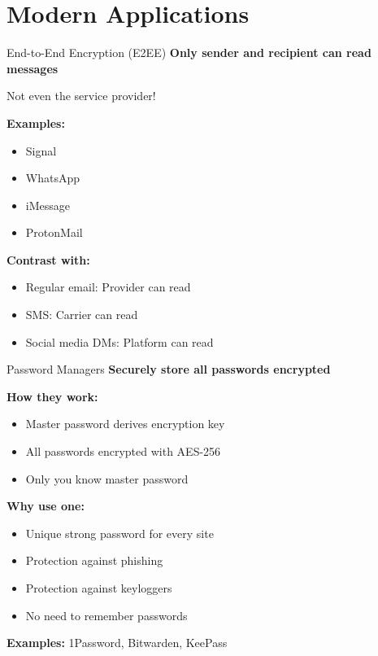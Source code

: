 \documentclass{beamer}
\begin{document}
\section{Modern Applications}

\begin{frame}{End-to-End Encryption (E2EE)}
\textbf{Only sender and recipient can read messages}

Not even the service provider!

\vspace{0.3cm}
\textbf{Examples:}
\begin{itemize}
    \item Signal
    \item WhatsApp
    \item iMessage
    \item ProtonMail
\end{itemize}

\vspace{0.3cm}
\textbf{Contrast with:}
\begin{itemize}
    \item Regular email: Provider can read
    \item SMS: Carrier can read
    \item Social media DMs: Platform can read
\end{itemize}

\end{frame}

\begin{frame}{Password Managers}
\textbf{Securely store all passwords encrypted}

\vspace{0.3cm}
\textbf{How they work:}
\begin{itemize}
    \item Master password derives encryption key
    \item All passwords encrypted with AES-256
    \item Only you know master password
\end{itemize}

\vspace{0.3cm}
\textbf{Why use one:}
\begin{itemize}
    \item Unique strong password for every site
    \item Protection against phishing
    \item Protection against keyloggers
    \item No need to remember passwords
\end{itemize}

\vspace{0.3cm}
\textbf{Examples:} 1Password, Bitwarden, KeePass
\end{frame}
\end{document}

